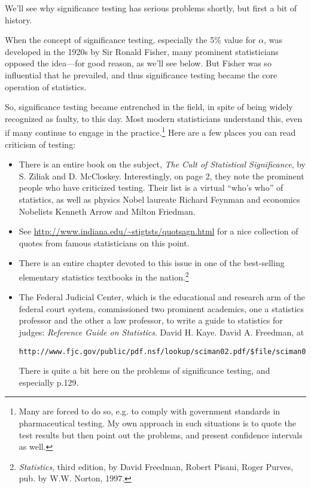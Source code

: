 We'll see why significance testing has serious problems shortly, but
first a bit of history.  

When the concept of significance testing, especially the 5\% value for
$\alpha$, was developed in the 1920s by Sir Ronald Fisher, many
prominent statisticians opposed the idea---for good reason, as we'll see
below.  But Fisher was so influential that he prevailed, and thus
significance testing became the core operation of statistics.

So, significance testing became entrenched in the field, in spite of
being widely recognized as faulty, to this day.  Most modern
statisticians understand this, even if many continue to engage in the
practice.\footnote{Many are forced to do so, e.g. to comply with
government standards in pharmaceutical testing.  My own approach in such
situations is to quote the test results but then point out the problems,
and present confidence intervals as well.}  Here are a few places you
can read criticism of testing:

\begin{itemize}

\item There is an entire book on the subject, {\it The Cult of
Statistical Significance}, by S. Ziliak and D. McCloskey.
Interestingly, on page 2, they note the prominent people who have
criticized testing.  Their list is a virtual ``who's who'' of
statistics, as well as physics Nobel laureate Richard Feynman and
economics Nobelists Kenneth Arrow and Milton Friedman. 

\item See \url{http://www.indiana.edu/~stigtsts/quotsagn.html} for a
nice collection of quotes from famous statisticians on this point.

\item There is an entire chapter devoted to this issue in one of the
best-selling elementary statistics textbooks in the
nation.\footnote{{\it Statistics}, third edition, by David Freedman,
Robert Pisani, Roger Purves, pub. by W.W.  Norton, 1997.} 

\item The Federal Judicial Center, which is the educational and research
arm of the federal court system, commissioned two prominent academics,
one a statistics professor and the other a law professor, to write a
guide to statistics for judges:  {\it Reference Guide on Statistics}.
David H.  Kaye. David A. Freedman, at
\begin{Verbatim}[fontsize=\relsize{-2}]
http://www.fjc.gov/public/pdf.nsf/lookup/sciman02.pdf/$file/sciman02.pdf
\end{Verbatim}

There is quite a bit here on the problems of significance testing, and
especially p.129.

\end{itemize}

